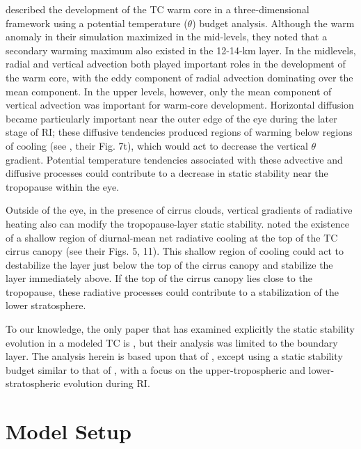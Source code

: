 \documentclass{ametsoc}
\begin{document}
\cite{SternZhang2013} described the development of the TC warm core in a three-dimensional framework using a potential temperature ($\theta$) budget analysis.
Although the warm anomaly in their simulation maximized in the mid-levels, they noted that a secondary warming maximum also existed in the 12-14-km layer.
In the midlevels, radial and vertical advection both played important roles in the development of the warm core, with the eddy component of radial advection dominating over the mean component.
In the upper levels, however, only the mean component of vertical advection was important for warm-core development.
Horizontal diffusion became particularly important near the outer edge of the eye during the later stage of RI; these diffusive tendencies produced regions of warming below regions of cooling (see \citeauthor{SternZhang2013} \citeyear{SternZhang2013}, their Fig. 7t), which would act to decrease the vertical $\theta$ gradient.
Potential temperature tendencies associated with these advective and diffusive processes could contribute to a decrease in static stability near the tropopause within the eye.

Outside of the eye, in the presence of cirrus clouds, vertical gradients of radiative heating also can modify the tropopause-layer static stability.
\cite{Buetal} noted the existence of a shallow region of diurnal-mean net radiative cooling at the top of the TC cirrus canopy (see their Figs. 5, 11).
This shallow region of cooling could act to destabilize the layer just below the top of the cirrus canopy and stabilize the layer immediately above.
If the top of the cirrus canopy lies close to the tropopause, these radiative processes could contribute to a stabilization of the lower stratosphere. 

To our knowledge, the only paper that has examined explicitly the static stability evolution in a modeled TC is \cite{Kepertetal2016}, but their analysis was limited to the boundary layer.
The analysis herein is based upon that of \cite{SternZhang2013}, except using a static stability budget similar to that of \cite{Kepertetal2016}, with a focus on the upper-tropospheric and lower-stratospheric evolution during RI.

 \section{Model Setup}
\end{document}
